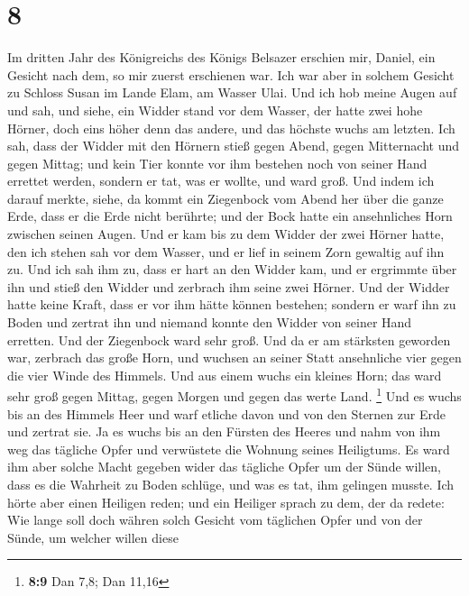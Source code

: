 \hypertarget{section-7}{%
\section{8}\label{section-7}}

 Im dritten Jahr des Königreichs des Königs Belsazer
erschien mir, Daniel, ein Gesicht nach dem, so mir zuerst erschienen
war.  Ich war aber in solchem Gesicht zu Schloss Susan im
Lande Elam, am Wasser Ulai.  Und ich hob meine Augen auf
und sah, und siehe, ein Widder stand vor dem Wasser, der hatte zwei hohe
Hörner, doch eins höher denn das andere, und das höchste wuchs am
letzten.  Ich sah, dass der Widder mit den Hörnern stieß
gegen Abend, gegen Mitternacht und gegen Mittag; und kein Tier konnte
vor ihm bestehen noch von seiner Hand errettet werden, sondern er tat,
was er wollte, und ward groß.  Und indem ich darauf
merkte, siehe, da kommt ein Ziegenbock vom Abend her über die ganze
Erde, dass er die Erde nicht berührte; und der Bock hatte ein
ansehnliches Horn zwischen seinen Augen.  Und er kam bis
zu dem Widder der zwei Hörner hatte, den ich stehen sah vor dem Wasser,
und er lief in seinem Zorn gewaltig auf ihn zu.  Und ich
sah ihm zu, dass er hart an den Widder kam, und er ergrimmte über ihn
und stieß den Widder und zerbrach ihm seine zwei Hörner. Und der Widder
hatte keine Kraft, dass er vor ihm hätte können bestehen; sondern er
warf ihn zu Boden und zertrat ihn und niemand konnte den Widder von
seiner Hand erretten.  Und der Ziegenbock ward sehr groß.
Und da er am stärksten geworden war, zerbrach das große Horn, und
wuchsen an seiner Statt ansehnliche vier gegen die vier Winde des
Himmels.  Und aus einem wuchs ein kleines Horn; das ward
sehr groß gegen Mittag, gegen Morgen und gegen das werte Land.
\footnote{\textbf{8:9} Dan 7,8; Dan 11,16}  Und es wuchs
bis an des Himmels Heer und warf etliche davon und von den Sternen zur
Erde und zertrat sie.  Ja es wuchs bis an den Fürsten des
Heeres und nahm von ihm weg das tägliche Opfer und verwüstete die
Wohnung seines Heiligtums.  Es ward ihm aber solche Macht
gegeben wider das tägliche Opfer um der Sünde willen, dass es die
Wahrheit zu Boden schlüge, und was es tat, ihm gelingen musste.
 Ich hörte aber einen Heiligen reden; und ein Heiliger
sprach zu dem, der da redete: Wie lange soll doch währen solch Gesicht
vom täglichen Opfer und von der Sünde, um welcher willen diese
